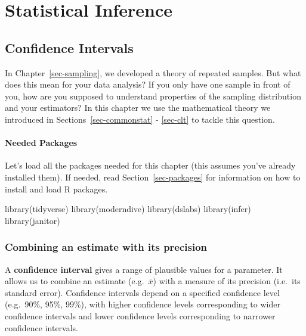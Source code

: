 \documentclass[
  letterpaper,
  DIV=11,
  numbers=noendperiod]{scrreprt}
\newenvironment{Shaded}{\begin{snugshade}}{\end{snugshade}}
\newcommand{\FunctionTok}[1]{\textcolor[rgb]{0.28,0.35,0.67}{#1}}
\newcommand{\NormalTok}[1]{\textcolor[rgb]{0.00,0.23,0.31}{#1}}
\theoremstyle{definition}
\theoremstyle{remark}
\begin{document}
\part{Statistical Inference}

\hypertarget{sec-confidence-int}{%
\chapter{Confidence Intervals}\label{sec-confidence-int}}

In Chapter~\ref{sec-sampling}, we developed a theory of repeated
samples. But what does this mean for your data analysis? If you only
have one sample in front of you, how are you supposed to understand
properties of the sampling distribution and your estimators? In this
chapter we use the mathematical theory we introduced in
Sections~\ref{sec-commonstat} - \ref{sec-clt} to tackle this question.

\hypertarget{needed-packages-4}{%
\subsection*{Needed Packages}\label{needed-packages-4}}

Let's load all the packages needed for this chapter (this assumes you've
already installed them). If needed, read Section~\ref{sec-packages} for
information on how to install and load R packages.

\begin{Shaded}
\begin{Highlighting}[]
\FunctionTok{library}\NormalTok{(tidyverse)}
\FunctionTok{library}\NormalTok{(moderndive)}
\FunctionTok{library}\NormalTok{(dslabs)}
\FunctionTok{library}\NormalTok{(infer)}
\FunctionTok{library}\NormalTok{(janitor)}
\end{Highlighting}
\end{Shaded}

\hypertarget{combining-an-estimate-with-its-precision}{%
\section{Combining an estimate with its
precision}\label{combining-an-estimate-with-its-precision}}

A \textbf{confidence interval} gives a range of plausible values for a
parameter. It allows us to combine an estimate (e.g.~\(\bar{x}\)) with a
measure of its precision (i.e.~its standard error). Confidence intervals
depend on a specified confidence level (e.g.~90\%, 95\%, 99\%), with
higher confidence levels corresponding to wider confidence intervals and
lower confidence levels corresponding to narrower confidence intervals.
\end{document}
